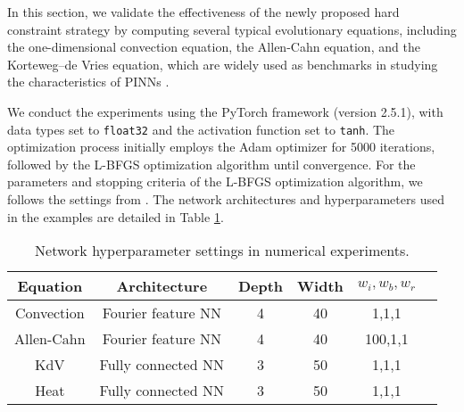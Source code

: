 \documentclass[preprint]{elsarticle}
\numberwithin{table}{section}
\numberwithin{equation}{section}
\numberwithin{figure}{section}
\begin{document}
\begin{CJK}{UTF8}{gbsn}
 


In this section, we validate the effectiveness of the newly proposed hard constraint strategy by computing several typical evolutionary equations, including the one-dimensional convection equation, the Allen-Cahn equation, and the Korteweg–de Vries equation, which are widely used as benchmarks in studying the characteristics of PINNs \cite{RAISSI2019686,Mojgani2022LagrangianPA,Krishnapriyan2021CharacterizingPF,PENWARDEN2023112464,krishnapriyan2021characterizing,Wang2024RespectingCF,JUNG2024117036}.
 

We conduct the experiments using the PyTorch framework (version 2.5.1), with data types set to \texttt{float32} and the activation function set to \texttt{tanh}. The optimization process initially employs the Adam optimizer \cite{kingma2017adam} for 5000 iterations, followed by the L-BFGS optimization algorithm \cite{LLLBFGS} until convergence. For the parameters and stopping criteria of the L-BFGS optimization algorithm, we follows the settings from \cite{LLLBFGS}. The network architectures and hyperparameters used in the examples are detailed in Table \ref{tab:hyperparameters}.
\begin{table}[htbp]
\centering
\begin{tabular}{c|ccccc}
\hline
Equation & Architecture& Depth &  Width  & $w_i,w_b,w_r$ \\ \hline
Convection & Fourier feature NN& 4 & 40 & 1,1,1 \\ 
Allen-Cahn & Fourier
feature NN & 4 & 40 & 100,1,1\\ 
KdV & Fully connected NN & 3 & 50 & 1,1,1\\ 
Heat & Fully connected NN & 3 & 50 & 1,1,1\\ 
\hline
\end{tabular}
\caption{Network hyperparameter settings in numerical experiments.}
\label{tab:hyperparameters}
\end{table}



\end{CJK}
\end{document}
